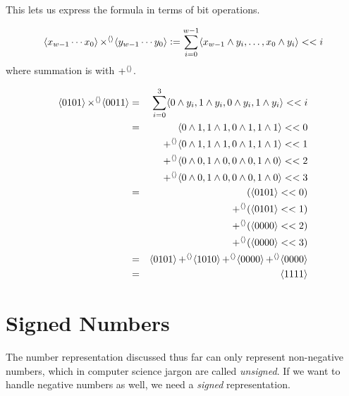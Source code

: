 This lets us express the formula in terms of bit operations.

\begin{definition}
\begin{align*}
  \langle x_{w-1}\cdots{}x_{0} \rangle \operatorname{\times^{\langle\rangle}} \langle y_{w-1}\cdots{}y_{0} \rangle \vcentcolon=
  \sum_{i=0}^{w-1} \langle x_{w-1} \land y_{i},\ldots,x_{0} \land y_{i} \rangle << i
\end{align*}
where summation is with $\operatorname{+^{\langle\rangle}}$.
\end{definition}

\begin{example}[$5 \times 3$]
  \begin{align*}
    \langle 0101 \rangle \operatorname{\times^{\langle\rangle}} \langle 0011 \rangle &=& \sum_{i=0}^{3} \langle 0 \land y_{i},1\land y_{i}, 0\land y_{i}, 1 \land y_{i} \rangle << i \\
                                              &=& \langle 0 \land 1,1\land 1, 0\land 1, 1 \land 1 \rangle << 0 \\
                                              &&\operatorname{+^{\langle\rangle}} \langle 0 \land 1,1\land 1, 0\land 1, 1 \land 1 \rangle << 1 \\
                                              &&\operatorname{+^{\langle\rangle}} \langle 0 \land 0,1\land 0, 0\land 0, 1 \land 0 \rangle << 2 \\
                                              &&\operatorname{+^{\langle\rangle}} \langle 0 \land 0,1\land 0, 0\land 0, 1 \land 0 \rangle << 3 \\
                                              &=&         (\langle 0101 \rangle << 0) \\
    &&\operatorname{+^{\langle\rangle}} (\langle 0101 \rangle << 1) \\
    && \operatorname{+^{\langle\rangle}} (\langle 0000 \rangle << 2) \\
                                              && \operatorname{+^{\langle\rangle}} (\langle 0000 \rangle << 3) \\
                                              &=& \langle 0101 \rangle \operatorname{+^{\langle\rangle}} \langle 1010 \rangle \operatorname{+^{\langle\rangle}} \langle 0000 \rangle  \operatorname{+^{\langle\rangle}} \langle 0000 \rangle \\
    &=& \langle 1111 \rangle
  \end{align*}
\end{example}

\section{Signed Numbers}
\label{sec:signed-numbers}

The number representation discussed thus far can only represent
non-negative numbers, which in computer science jargon are called
\emph{unsigned}.  If we want to handle negative numbers as well, we
need a \emph{signed} representation.

